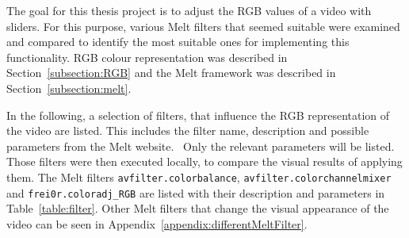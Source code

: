 \documentclass[../MasterThesis.tex]{subfiles}
\begin{document}
The goal for this thesis project is to adjust the RGB values of a video with sliders. For this purpose, various Melt filters that seemed suitable were examined and compared to identify the most suitable ones for implementing this functionality. RGB colour representation was described in Section~\ref{subsection:RGB} and the Melt framework was described in Section~\ref{subsection:melt}.

In the following, a selection of filters, that influence the RGB representation of the video are listed. This includes the filter name, description and possible parameters from the Melt website.~\cite{melt_filters} Only the relevant parameters will be listed.
Those filters were then executed locally, to compare the visual results of applying them.
The Melt filters \texttt{avfilter.colorbalance}, \texttt{avfilter\-.colorchannelmixer} and \texttt{frei0r\-.coloradj\_RGB} are listed with their description and parameters in Table~\ref{table:filter}. Other Melt filters that change the visual appearance of the video can be seen in Appendix~\ref{appendix:differentMeltFilter}.
\end{document}
